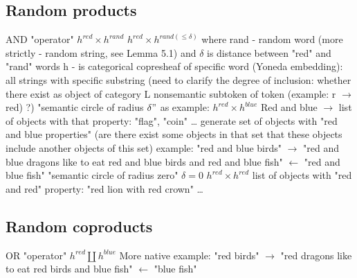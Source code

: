 \documentclass{article}
\begin{document}
\subsection{Random products}
AND "operator"
\newline
$h^{red} \times h^{rand}$
\newline
$h^{red} \times h^{rand(\leq \delta)}$
\newline
where
\newline
rand - random word (more strictly - random string, see Lemma 5.1)
\newline
and $\delta$ is distance between "red" and "rand" words
\newline
h - is categorical copresheaf of specific word (Yoneda embedding): all strings with specific substring
(need to clarify the degree of inclusion:
whether there exist as object of category L nonsemantic subtoken
of token (example: r $\xrightarrow{}$ red) ?)
\newline
\newline
"semantic circle of radius $\delta"$
\newline
as example:
\newline
$h^{red} \times h^{blue}$
\newline
Red and blue $\xrightarrow{}{}$ list of objects with that property: "flag", "coin" \ldots
\newline
generate set of objects with "red and blue properties"
\newline
(are there exist some objects in that set that these objects include another objects of this set)
\newline
example:
\newline
"red and blue birds" $\xrightarrow{}{}$ "red and blue dragons like to eat red and blue birds and red and blue fish" $\xleftarrow{}{}$ "red and blue fish"
\newline
\newline
"semantic circle of radius zero"
\newline
$\delta=0$
\newline
$h^{red} \times h^{red}$
\newline
list of objects with "red and red" property: "red lion with red crown" \ldots

\subsection{Random coproducts}
OR "operator"
\newline
$h^{red} \coprod h^{blue}$
\newline
More native example:
\newline
"red birds" $\xrightarrow{}{}$ "red dragons like to eat red birds and blue fish" $\xleftarrow{}{}$ "blue fish"
\end{document}
